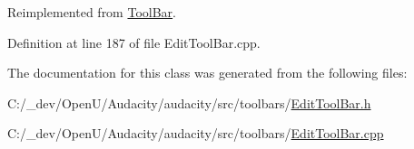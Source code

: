 Reimplemented from \hyperlink{class_tool_bar_aa99fb02eb388e5f1c3bc59443bfd4d00}{Tool\+Bar}.



Definition at line 187 of file Edit\+Tool\+Bar.\+cpp.



The documentation for this class was generated from the following files\+:\begin{DoxyCompactItemize}
\item 
C\+:/\+\_\+dev/\+Open\+U/\+Audacity/audacity/src/toolbars/\hyperlink{_edit_tool_bar_8h}{Edit\+Tool\+Bar.\+h}\item 
C\+:/\+\_\+dev/\+Open\+U/\+Audacity/audacity/src/toolbars/\hyperlink{_edit_tool_bar_8cpp}{Edit\+Tool\+Bar.\+cpp}\end{DoxyCompactItemize}
